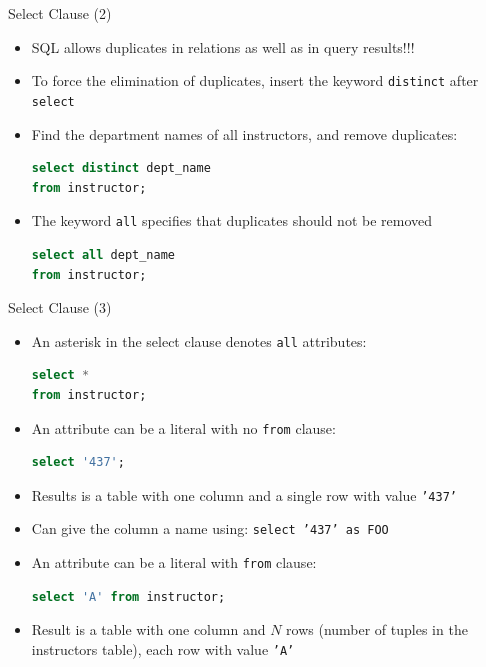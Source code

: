 \documentclass[aspectratio=169, xcolor=dvipsnames]{beamer}
\begin{document}
\begin{frame}[fragile]{Select Clause (2)}
    \begin{itemize}[<+->]
        \item SQL allows duplicates in relations as well as in query results!!!
        \item To force the elimination of duplicates, insert the keyword \texttt{distinct} after \texttt{select}
        \item Find the department names of all instructors, and remove duplicates:
        \begin{lstlisting}[language=SQL]
select distinct dept_name
from instructor;
        \end{lstlisting}
        \item The keyword \texttt{all} specifies that duplicates should not be removed
        \begin{lstlisting}[language=SQL]
select all dept_name
from instructor;
        \end{lstlisting}
    \end{itemize}
\end{frame}

\begin{frame}[fragile]{Select Clause (3)}
    \begin{itemize}[<+->]
        \item An asterisk in the select clause denotes \texttt{all} attributes:
        \begin{lstlisting}[language=SQL]
select *
from instructor;
        \end{lstlisting}
        \item An attribute can be a literal with no \texttt{from} clause:
        \begin{lstlisting}[language=SQL]
select '437';
        \end{lstlisting}
        \item Results is a table with one column and a single row with value \texttt{'437'}
        \item Can give the column a name using: \texttt{select '437' as FOO}
        \item An attribute can be a literal with \texttt{from} clause:
        \begin{lstlisting}[language=SQL]
select 'A' from instructor;
        \end{lstlisting}
        \item Result is a table with one column and $N$ rows (number of tuples in the instructors table), each row with value \texttt{'A'}
    \end{itemize}
\end{frame}
\end{document}
